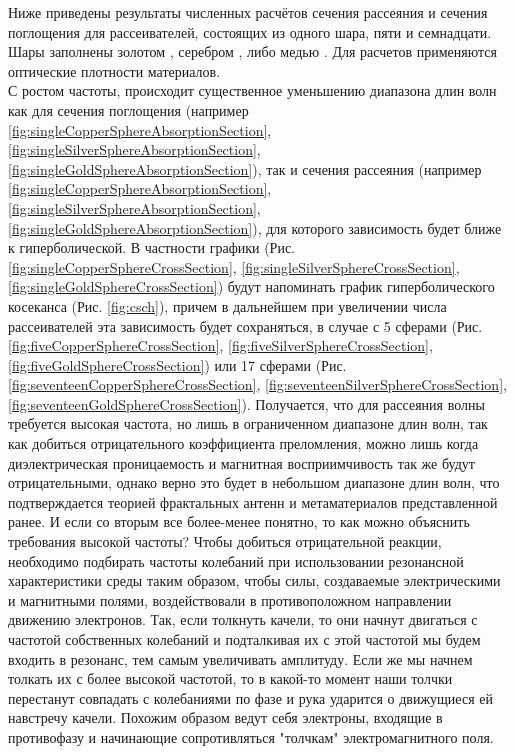 Ниже приведены результаты численных расчётов сечения рассеяния и сечения поглощения для рассеивателей, состоящих из одного шара, пяти и семнадцати. Шары заполнены золотом \cite{Olmon2012}, серебром \cite{Yang2015}, либо медью \cite{Querry1985}. Для расчетов применяются оптические плотности материалов.\\
С ростом частоты, происходит существенное уменьшению диапазона длин волн как для сечения поглощения (например \ref{fig:singleCopperSphereAbsorptionSection},  \ref{fig:singleSilverSphereAbsorptionSection}, \ref{fig:singleGoldSphereAbsorptionSection}), так и сечения рассеяния (например \ref{fig:singleCopperSphereAbsorptionSection}, \ref{fig:singleSilverSphereAbsorptionSection}, \ref{fig:singleGoldSphereAbsorptionSection}), для которого зависимость будет ближе к гиперболической. В частности графики (Рис. \ref{fig:singleCopperSphereCrossSection}, \ref{fig:singleSilverSphereCrossSection}, \ref{fig:singleGoldSphereCrossSection}) будут напоминать график гиперболического косеканса (Рис. \ref{fig:csch}), причем в дальнейшем при увеличении числа рассеивателей эта зависимость будет сохраняться, в случае с 5 сферами (Рис. \ref{fig:fiveCopperSphereCrossSection}, \ref{fig:fiveSilverSphereCrossSection}, \ref{fig:fiveGoldSphereCrossSection}) или 17 сферами (Рис. \ref{fig:seventeenCopperSphereCrossSection}, \ref{fig:seventeenSilverSphereCrossSection}, \ref{fig:seventeenGoldSphereCrossSection}). Получается, что для рассеяния волны требуется высокая частота, но лишь в ограниченном диапазоне длин волн, так как добиться отрицательного коэффициента преломления, можно лишь когда диэлектрическая проницаемость и магнитная восприимчивость так же будут отрицательными, однако верно это будет в небольшом диапазоне длин волн, что подтверждается теорией фрактальных антенн и метаматериалов представленной ранее. И если со вторым все более-менее понятно, то как можно объяснить требования высокой частоты? Чтобы добиться отрицательной реакции, необходимо подбирать частоты колебаний при использовании резонансной характеристики среды таким образом, чтобы силы, создаваемые электрическими и магнитными полями, воздействовали в противоположном направлении движению электронов. Так, если толкнуть качели, то они начнут двигаться с частотой собственных колебаний и подталкивая их с этой частотой мы будем входить в резонанс, тем самым увеличивать амплитуду. Если же мы начнем толкать их с более высокой частотой, то в какой-то момент наши толчки перестанут совпадать с колебаниями по фазе и рука ударится о движущиеся ей навстречу качели. Похожим образом ведут себя электроны, входящие в противофазу и начинающие сопротивляться "толчкам" электромагнитного поля.
